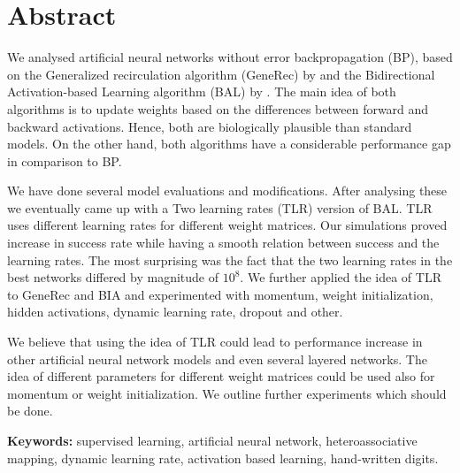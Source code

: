 
\section*{Abstract}

We analysed artificial neural networks without error backpropagation (BP), based on the Generalized recirculation algorithm (GeneRec) by \citet{o1996bio} and the Bidirectional Activation-based Learning algorithm (BAL) by \citet{farkas2013bal}. The main idea of both algorithms is to update weights based on the differences between forward and backward activations. Hence, both are biologically plausible than standard models. On the other hand, both algorithms have a considerable performance gap in comparison to BP.

We have done several model evaluations and modifications. After analysing these we eventually came up with a Two learning rates (TLR) version of BAL. TLR uses different learning rates for different weight matrices. Our simulations proved increase in success rate while having a smooth relation between success and the learning rates. The most surprising was the fact that the two learning rates in the best networks differed by magnitude of $10^8$. We further applied the idea of TLR to GeneRec and BIA and experimented with momentum, weight initialization, hidden activations, dynamic learning rate, dropout and other. 

We believe that using the idea of TLR could lead to performance increase in other artificial neural network models and even several layered networks. The idea of different parameters for different weight matrices could be used also for momentum or weight initialization. We outline further experiments which should be done. 

\begin{flushleft}
  \textbf{Keywords:} supervised learning, artificial neural network, heteroassociative mapping, dynamic learning rate, activation based learning, hand-written digits. 
\end{flushleft}


